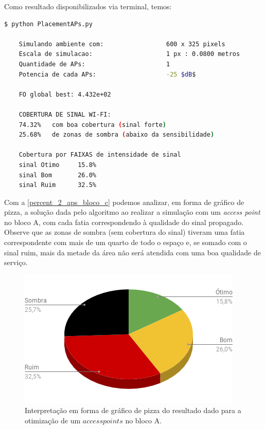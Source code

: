 \documentclass[
	12pt,				%
	twoside,			%
	a4paper,			%
	english,			%
	french,				%
	spanish,			%
	brazil				%
	]{abntex2}
\begin{document}
Como resultado disponibilizados via terminal, temos:

\begin{lstlisting}[language=bash]
    $ python PlacementAPs.py 
    
    Simulando ambiente com:                 600 x 325 pixels
    Escala de simulacao:                    1 px : 0.0800 metros
    Quantidade de APs:                      1
    Potencia de cada APs:                   -25 $dB$
    
    FO global best: 4.432e+02
    
    COBERTURA DE SINAL WI-FI:
    74.32%   com boa cobertura (sinal forte)
    25.68%   de zonas de sombra (abaixo da sensibilidade)
    
    Cobertura por FAIXAS de intensidade de sinal
    sinal Otimo     15.8%
    sinal Bom       26.0%
    sinal Ruim      32.5%

\end{lstlisting}

Com a \autoref{percent_2_aps_bloco_c} podemos analizar, em forma de
gráfico de pizza, a solução dada pelo algoritmo ao realizar a simulação
com um \emph{access point} no bloco A, com cada fatia correspondendo à
qualidade do sinal propagado. Observe que as zonas de sombra (sem
cobertura do sinal) tiveram uma fatia correspondente com mais de um
quarto de todo o espaço e, se somado com o sinal ruim, mais da metade da
área não será atendida com uma boa qualidade de serviço.

\begin{figure}[ht]
    \caption{\label{percent_2_aps_bloco_c} Interpretação em forma de gráfico de pizza do resultado dado para a otimização
     de um $access points$ no bloco A.}
    \begin{center}
        \includegraphics[scale=0.7]{imagens/prop-bloco-percent-a-2.png}
    \end{center}
\end{figure}
\end{document}
